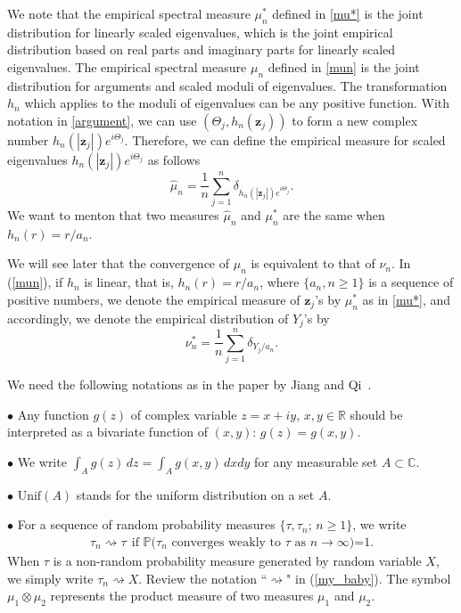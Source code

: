 \documentclass[11pt]{article}
\numberwithin{equation}{section}
\newcommand{\bea}{\begin{eqnarray}}
\newcommand{\eea}{\end{eqnarray}}
\newcommand{\lbl}{\label}
\newcommand{\bz}{\mathbf{z}}
\begin{document}
We note that the empirical spectral measure $\mu_n^*$ defined in
\eqref{mu*} is the joint distribution for linearly scaled
eigenvalues, which is the joint empirical distribution based on real
parts and imaginary parts for linearly scaled eigenvalues. The
empirical spectral measure $\mu_n$ defined in \eqref{mun} is the
joint distribution for arguments and scaled moduli of eigenvalues.
The transformation $h_n$ which applies to the moduli of eigenvalues
can be any positive function.  With notation in \eqref{argument}, we
can use $(\Theta_j, h_n(\bz_j))$ to form a new complex number
$h_n(|\bz_j|)e^{i\Theta_j}$.  Therefore, we can define the empirical
measure for scaled eigenvalues $h_n(|\bz_j|)e^{i\Theta_j}$ as
follows
\begin{equation}\label{hatmu}
\hat\mu_n=\frac1n\sum^n_{j=1}\delta_{h_n(|\mathbf{z}_j|)e^{i\Theta_j}}.
\end{equation}
We want to menton that two measures $\hat\mu_n$ and $\mu_n^*$ are
the same when $h_n(r)=r/a_n$.

We will see later that the convergence of $\mu_n$ is equivalent to
that of $\nu_n$. In (\ref{mun}), if $h_n$ is linear, that is,
$h_n(r)=r/a_n$, where $\{a_n, n\geq 1\}$ is a sequence of positive
numbers, we denote the empirical measure of $\mathbf{z}_j$'s by
$\mu_n^*$ as in \eqref{mu*}, and accordingly, we denote the
empirical distribution of $Y_j$'s by
\begin{equation}\label{nun*}
\nu_n^*=\frac{1}{n}\sum^n_{j=1}\delta_{Y_j/a_n}.
\end{equation}


We need the following notations as in the paper by Jiang and
Qi~\cite{JiangQi2019}.

\noindent $\bullet$ Any function $g(z)$ of complex variable
$z=x+iy$, $x,y\in\mathbb{R}$ should be interpreted as a bivariate
function of $(x,y)$:  $g(z)=g(x, y)$.

\noindent $\bullet$ We write $\int_Ag(z)\,dz=\int_Ag(x,y)\,dxdy$ for
any measurable set $A\subset \mathbb{C}.$

\noindent $\bullet$  $\mbox{Unif}(A)$ stands for the uniform
distribution on a set $A$.

\noindent $\bullet$ For a sequence of random probability measures
$\{\tau, \tau_n;\, n\geq 1\}$, we write \bea\lbl{my_baby} \tau_n
\rightsquigarrow \tau\ \ \mbox{if \ $\mathbb{P}$($\tau_n$  converges
weakly to $\tau$ as $n\to\infty$)=1}. \eea When $\tau$ is a
non-random probability measure generated by random variable $X$, we
simply write $\tau_n \rightsquigarrow X$. Review the notation
``$\rightsquigarrow$" in (\ref{my_baby}). The symbol
$\mu_1\otimes\mu_2$ represents the product measure of two measures
$\mu_1$ and $\mu_2$.
\end{document}
